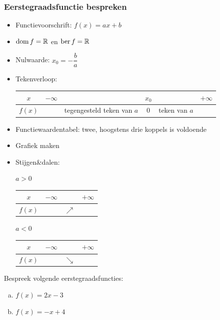 \documentclass[12pt,twoside,a4paper]{article}
\begin{document}
\subsubsection*{Eerstegraadsfunctie bespreken}
\begin{mdframed}
  \begin{itemize}
  \item Functievoorschrift: $f(x)=ax + b$
  \item $\dom f = \mathbb{R}$ en $\ber f = \mathbb{R}$
  \item Nulwaarde: $x_0=-\dfrac{b}{a}$
  \item Tekenverloop:
    \begin{center}
      \begin{tabular}{c|lp{2.5cm}cp{1.5cm}r}
        $x$ & $-\infty$ & & $x_0$ & & $+\infty$\\
        \hline
        $f(x)$ & & tegengesteld teken van $a$ & 0 & teken van $a$ &
      \end{tabular}
    \end{center}
  \item Functiewaardentabel: twee, hoogstens drie koppels is voldoende
  \item Grafiek maken
  \item Stijgen\&dalen:\\
    \begin{minipage}{0.45\textwidth}
      \centering $a>0$\\
      \begin{tabular}{c|lcr}
        $x$ & $-\infty$ & & $+\infty$\\
        \hline
        $f(x)$ & & $\nearrow$ &
      \end{tabular}
    \end{minipage}
    \begin{minipage}{0.45\textwidth}
      \centering $a<0$\\
      \begin{tabular}{c|lcr}
        $x$ & $-\infty$ & & $+\infty$\\
        \hline
        $f(x)$ & & $\searrow$ &
      \end{tabular}
    \end{minipage}
  \end{itemize}
\end{mdframed}

\begin{oefening}
  Bespreek volgende eerstegraadsfuncties:
  \begin{enumerate}[(a)]
  \item $f(x)=2x-3$
  \item $f(x)=-x+4$
  \end{enumerate}
\end{oefening}
\end{document}
